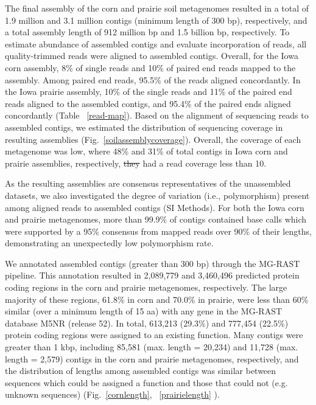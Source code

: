 \documentclass{pnastwo}
\providecommand{\DIFadd}[1]{{\protect\color{blue}\uwave{#1}}} %
\providecommand{\DIFdel}[1]{{\protect\color{red}\sout{#1}}}                      %
\providecommand{\DIFaddbegin}{} %
\providecommand{\DIFaddend}{} %
\providecommand{\DIFdelbegin}{} %
\providecommand{\DIFdelend}{} %
\begin{document}
\begin{article}
The final assembly of the corn and prairie soil metagenomes resulted in a total
of 1.9 million and 3.1 million contigs (minimum length of 300 bp), respectively,
and a total assembly length of 912 million bp and 1.5 billion bp, respectively.
To estimate abundance of assembled contigs and evaluate incorporation of reads,
all quality-trimmed reads were aligned to assembled contigs. Overall, for the
Iowa corn assembly, 8\% of single reads and 10\% of paired end reads mapped to
the assembly. Among paired end reads, 95.5\% of the reads aligned concordantly.
In the Iowa prairie assembly, 10\% of the single reads and 11\% of the paired
end reads aligned to the assembled contigs, and 95.4\% of the paired ends
aligned concordantly (Table ~\ref{read-map}). Based on the alignment of
sequencing reads to assembled contigs, we estimated the distribution of
sequencing coverage in \DIFaddbegin \DIFadd{the }\DIFaddend resulting assemblies (Fig.~\ref{soilassemblycoverage}).
Overall, the coverage of each metagenome was low, where 48\% and 31\% of total
contigs in Iowa corn and prairie assemblies, respectively, \DIFdelbegin \DIFdel{they }\DIFdelend had a read
coverage less than 10.

As the resulting assemblies are consensus representatives of the unassembled
datasets, we also investigated the degree of variation (i.e., polymorphism)
present among aligned reads to assembled contigs (SI Methods). 
For both the Iowa corn and prairie metagenomes, more than 99.9\% of
contigs contained base calls which were supported by a 95\% consensus from
mapped reads over 90\% of their lengths, demonstrating an unexpectedly low
polymorphism rate.

We annotated assembled contigs (greater than 300 bp) through the MG-RAST
pipeline. This annotation resulted in 2,089,779 and 3,460,496 predicted protein
coding regions in the corn and prairie metagenomes, respectively. The large
majority of these regions, 61.8\% in corn and 70.0\% in prairie, were less than 60\% similar (over a minimum length of 15 aa) with any gene in the MG-RAST
database M5NR (release 52). In total,
613,213 (29.3\%) and 777,454 (22.5\%) protein coding regions were assigned to an
existing function. Many contigs were greater than 1 kbp, including 85,581 (max.
length = 20,234) and 11,728 (max. length = 2,579) contigs in the corn and
prairie metagenomes, respectively, and the distribution of lengths among
assembled contigs was similar between sequences which could be assigned a
function and those that could not (e.g. unknown sequences) (Fig.~\ref{cornlength}, ~\ref{prairielength}
).


\end{article}
\end{document}
